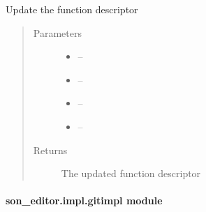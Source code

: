 \documentclass[letterpaper,10pt,english]{sphinxmanual}
\begin{document}

\begin{fulllineitems}
\label{_source/son_editor.impl:son_editor.impl.functionsimpl.update_function}
Update the function descriptor
\begin{quote}\begin{description}
\item[{Parameters}] \leavevmode\begin{itemize}
\item {} 
 -- 

\item {} 
 -- 

\item {} 
 -- 

\item {} 
 -- 

\end{itemize}

\item[{Returns}] \leavevmode
The updated function descriptor

\end{description}\end{quote}

\end{fulllineitems}


\begin{fulllineitems}
\label{_source/son_editor.impl:son_editor.impl.functionsimpl.validate_vnf}
\end{fulllineitems}



\paragraph{son\_editor.impl.gitimpl module}
\label{_source/son_editor.impl:son-editor-impl-gitimpl-module}\label{_source/son_editor.impl:module-son_editor.impl.gitimpl}
\end{document}
